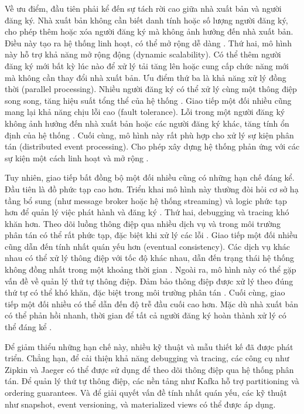 Về ưu điểm, đầu tiên phải kể đến sự tách rời cao giữa nhà xuất bản và người đăng ký. Nhà xuất bản không cần biết danh tính hoặc số lượng người đăng ký, cho phép thêm hoặc xóa người đăng ký mà không ảnh hưởng đến nhà xuất bản. Điều này tạo ra hệ thống linh hoạt, có thể mở rộng dễ dàng \cite{newman2015}. Thứ hai, mô hình này hỗ trợ khả năng mở rộng động (dynamic scalability). Có thể thêm người đăng ký mới bất kỳ lúc nào để xử lý tải tăng lên hoặc cung cấp chức năng mới mà không cần thay đổi nhà xuất bản. Ưu điểm thứ ba là khả năng xử lý đồng thời (parallel processing). Nhiều người đăng ký có thể xử lý cùng một thông điệp song song, tăng hiệu suất tổng thể của hệ thống \cite{wolff2016}. Giao tiếp một đối nhiều cũng mang lại khả năng chịu lỗi cao (fault tolerance). Lỗi trong một người đăng ký không ảnh hưởng đến nhà xuất bản hoặc các người đăng ký khác, tăng tính ổn định của hệ thống \cite{richardson2019}. Cuối cùng, mô hình này rất phù hợp cho xử lý sự kiện phân tán (distributed event processing). Cho phép xây dựng hệ thống phản ứng với các sự kiện một cách linh hoạt và mở rộng \cite{hohpe2004}.

Tuy nhiên, giao tiếp bất đồng bộ một đối nhiều cũng có những hạn chế đáng kể. Đầu tiên là đồ phức tạp cao hơn. Triển khai mô hình này thường đòi hỏi cơ sở hạ tầng bổ sung (như message broker hoặc hệ thống streaming) và logic phức tạp hơn để quản lý việc phát hành và đăng ký \cite{newman2015}. Thứ hai, debugging và tracing khó khăn hơn. Theo dõi luồng thông điệp qua nhiều dịch vụ và trong môi trường phân tán có thể rất phức tạp, đặc biệt khi xử lý các lỗi \cite{wolff2016}. Giao tiếp một đối nhiều cũng dẫn đến tính nhất quán yếu hơn (eventual consistency). Các dịch vụ khác nhau có thể xử lý thông điệp với tốc độ khác nhau, dẫn đến trạng thái hệ thống không đồng nhất trong một khoảng thời gian \cite{richardson2019}. Ngoài ra, mô hình này có thể gặp vấn đề về quản lý thứ tự thông điệp. Đảm bảo thông điệp được xử lý theo đúng thứ tự có thể khó khăn, đặc biệt trong môi trường phân tán \cite{aksakalli2021}. Cuối cùng, giao tiếp một đối nhiều có thể dẫn đến độ trễ đầu cuối cao hơn. Mặc dù nhà xuất bản có thể phản hồi nhanh, thời gian để tất cả người đăng ký hoàn thành xử lý có thể đáng kể \cite{jun2018}.

Để giảm thiểu những hạn chế này, nhiều kỹ thuật và mẫu thiết kế đã được phát triển. Chẳng hạn, để cải thiện khả năng debugging và tracing, các công cụ như Zipkin và Jaeger có thể được sử dụng để theo dõi thông điệp qua hệ thống phân tán. Để quản lý thứ tự thông điệp, các nền tảng như Kafka hỗ trợ partitioning và ordering guarantees. Và để giải quyết vấn đề tính nhất quán yếu, các kỹ thuật như snapshot, event versioning, và materialized views có thể được áp dụng.

